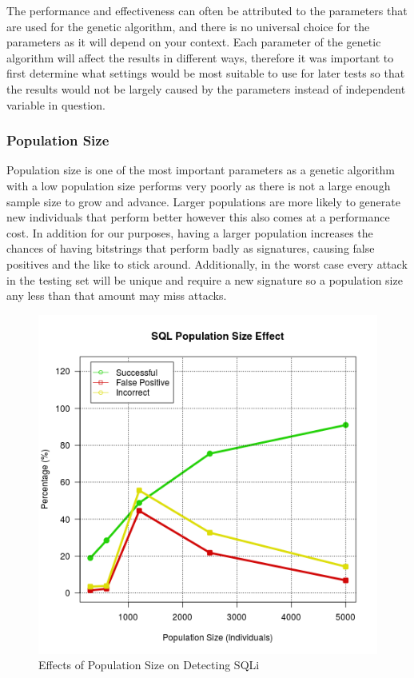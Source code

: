 The performance and effectiveness can often be attributed to the parameters that are used for the genetic algorithm, and there is no universal choice for the parameters as it will depend on your context.  %
Each parameter of the genetic algorithm will affect the results in different ways, therefore it was important to first determine what settings would be most suitable to use for later tests so that the results would not be largely caused by the parameters instead of independent variable in question.  

\subsubsection{Population Size}

Population size is one of the most important parameters as a genetic algorithm with a low population size performs very poorly as there is not a large enough sample size to grow and advance.  Larger populations are more likely to generate new individuals that perform better however this also comes at a performance cost. %
In addition for our purposes, having a larger population increases the chances of having bitstrings that perform badly as signatures, causing false positives and the like to stick around.  Additionally, in the worst case every attack in the testing set will be unique and require a new signature so a population size any less than that amount may miss attacks.

\begin{figure}
	\label{fig:resPopSize}
	\includegraphics[width=450px]{./assets/results/ga/pop/Results_SQL.png}
	\caption{Effects of Population Size on Detecting SQLi}
\end{figure}

